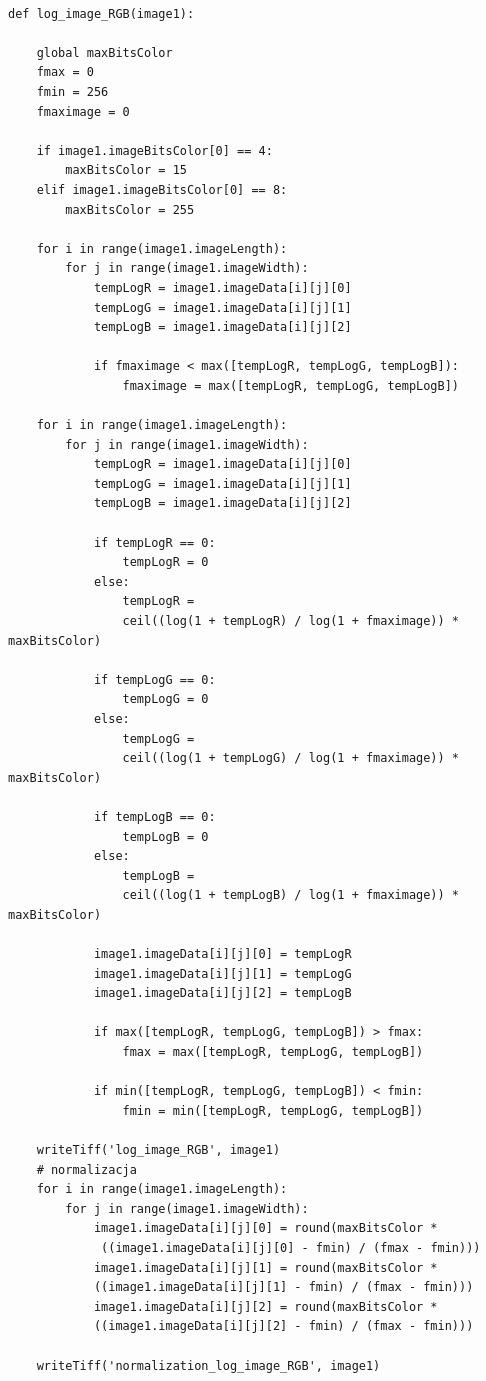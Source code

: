 \documentclass[magisterska,openany]{pracadypl}
\begin{document}
\lstset{language=Python}
\vspace{0.25cm}
\begin{lstlisting}[caption={Logarytmowanie obrazu}]

def log_image_RGB(image1):

    global maxBitsColor
    fmax = 0
    fmin = 256
    fmaximage = 0

    if image1.imageBitsColor[0] == 4:
        maxBitsColor = 15
    elif image1.imageBitsColor[0] == 8:
        maxBitsColor = 255

    for i in range(image1.imageLength):
        for j in range(image1.imageWidth):
            tempLogR = image1.imageData[i][j][0]
            tempLogG = image1.imageData[i][j][1]
            tempLogB = image1.imageData[i][j][2]

            if fmaximage < max([tempLogR, tempLogG, tempLogB]):
                fmaximage = max([tempLogR, tempLogG, tempLogB])

    for i in range(image1.imageLength):
        for j in range(image1.imageWidth):
            tempLogR = image1.imageData[i][j][0]
            tempLogG = image1.imageData[i][j][1]
            tempLogB = image1.imageData[i][j][2]

            if tempLogR == 0:
                tempLogR = 0
            else:
                tempLogR = 
                ceil((log(1 + tempLogR) / log(1 + fmaximage)) * maxBitsColor)

            if tempLogG == 0:
                tempLogG = 0
            else:
                tempLogG = 
                ceil((log(1 + tempLogG) / log(1 + fmaximage)) * maxBitsColor)

            if tempLogB == 0:
                tempLogB = 0
            else:
                tempLogB = 
                ceil((log(1 + tempLogB) / log(1 + fmaximage)) * maxBitsColor)

            image1.imageData[i][j][0] = tempLogR
            image1.imageData[i][j][1] = tempLogG
            image1.imageData[i][j][2] = tempLogB

            if max([tempLogR, tempLogG, tempLogB]) > fmax:
                fmax = max([tempLogR, tempLogG, tempLogB])

            if min([tempLogR, tempLogG, tempLogB]) < fmin:
                fmin = min([tempLogR, tempLogG, tempLogB])

    writeTiff('log_image_RGB', image1)
    # normalizacja
    for i in range(image1.imageLength):
        for j in range(image1.imageWidth):
            image1.imageData[i][j][0] = round(maxBitsColor *
             ((image1.imageData[i][j][0] - fmin) / (fmax - fmin)))
            image1.imageData[i][j][1] = round(maxBitsColor * 
            ((image1.imageData[i][j][1] - fmin) / (fmax - fmin)))
            image1.imageData[i][j][2] = round(maxBitsColor * 
            ((image1.imageData[i][j][2] - fmin) / (fmax - fmin)))

    writeTiff('normalization_log_image_RGB', image1)

\end{lstlisting}
\end{document}
